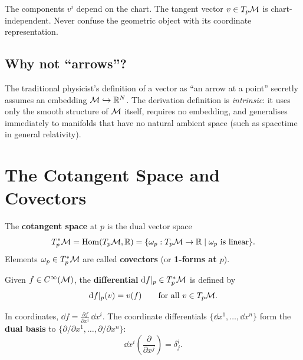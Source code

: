 \begin{warning}
The components $v^i$ depend on the chart. The tangent vector $v \in T_p\mathcal{M}$ is chart-independent. Never confuse the geometric object with its coordinate representation.
\end{warning}

\subsection*{Why not ``arrows''?}

The traditional physicist's definition of a vector as ``an arrow at a point'' secretly assumes an embedding $\mathcal{M} \hookrightarrow \mathbb{R}^N$. The derivation definition is \emph{intrinsic}: it uses only the smooth structure of $\mathcal{M}$ itself, requires no embedding, and generalises immediately to manifolds that have no natural ambient space (such as spacetime in general relativity).

\section{The Cotangent Space and Covectors}

\begin{definition}
The \textbf{cotangent space} at $p$ is the dual vector space
\begin{equation}
T_p^*\mathcal{M} = \operatorname{Hom}(T_p\mathcal{M}, \mathbb{R}) = \{\omega_p : T_p\mathcal{M} \to \mathbb{R} \mid \omega_p \text{ is linear}\}.
\end{equation}
Elements $\omega_p \in T_p^*\mathcal{M}$ are called \textbf{covectors} (or \textbf{1-forms at $p$}).
\end{definition}

\begin{definition}
Given $f \in C^{\infty}(\mathcal{M})$, the \textbf{differential} $\mathrm{d} f|_p \in T_p^*\mathcal{M}$ is defined by
\begin{equation}
\mathrm{d} f|_p(v) = v(f) \qquad \text{for all } v \in T_p\mathcal{M}.
\end{equation}
\end{definition}

In coordinates, $\dd f = \frac{\partial f}{\partial x^i}\,\dd x^i$. The coordinate differentials $\{\dd x^1, \ldots, \dd x^n\}$ form the \textbf{dual basis} to $\{\partial/\partial x^1, \ldots, \partial/\partial x^n\}$:
\begin{equation}
\dd x^i\!\left(\frac{\partial}{\partial x^j}\right) = \delta^i_j.
\end{equation}

